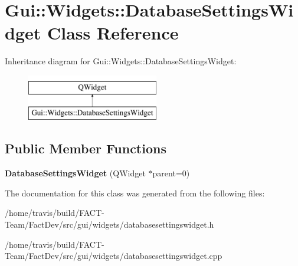\hypertarget{classGui_1_1Widgets_1_1DatabaseSettingsWidget}{\section{Gui\-:\-:Widgets\-:\-:Database\-Settings\-Widget Class Reference}
\label{classGui_1_1Widgets_1_1DatabaseSettingsWidget}
}
Inheritance diagram for Gui\-:\-:Widgets\-:\-:Database\-Settings\-Widget\-:\begin{figure}[H]
\begin{center}
\leavevmode
\includegraphics[height=2.000000cm]{de/d51/classGui_1_1Widgets_1_1DatabaseSettingsWidget}
\end{center}
\end{figure}
\subsection*{Public Member Functions}
\begin{DoxyCompactItemize}
\item 
\hypertarget{classGui_1_1Widgets_1_1DatabaseSettingsWidget_a723805fcd8e71878c6d66b7296f16d85}{{\bfseries Database\-Settings\-Widget} (Q\-Widget $\ast$parent=0)}\label{classGui_1_1Widgets_1_1DatabaseSettingsWidget_a723805fcd8e71878c6d66b7296f16d85}

\end{DoxyCompactItemize}


The documentation for this class was generated from the following files\-:\begin{DoxyCompactItemize}
\item 
/home/travis/build/\-F\-A\-C\-T-\/\-Team/\-Fact\-Dev/src/gui/widgets/databasesettingswidget.\-h\item 
/home/travis/build/\-F\-A\-C\-T-\/\-Team/\-Fact\-Dev/src/gui/widgets/databasesettingswidget.\-cpp\end{DoxyCompactItemize}
